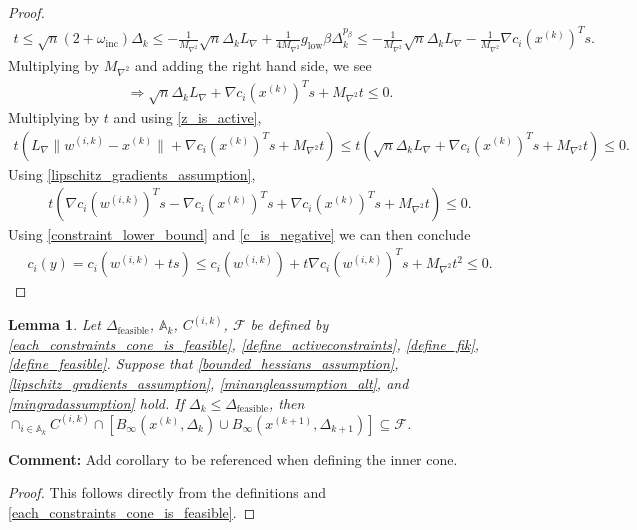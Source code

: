 \documentclass{article}
\newenvironment{comment}
  {\par\medskip
   \color{red}%
   \begin{framed}
   \textbf{Comment: }\ignorespaces}
 {\end{framed}
  \medskip}
\newtheorem{lemma}[theorem]{Lemma}
\theoremstyle{case}
\numberwithin{theorem}{subsection}
\newcommand{\activeconstraintsk}{{\mathbb A_{k}}}
\newcommand{\dfeas}{{\Delta_{\textrm{feasible}}}}
\newcommand{\dk}{\Delta_k}
\newcommand{\dkpo}{\Delta_{k+1}}
\newcommand{\feasible}{{\mathcal F}}
\newcommand{\lipgrad}{{L_{\nabla}}}
\newcommand{\maxhessian}{{M_{\nabla^2}}}
\newcommand{\mingrad}{{ g_{\textrm{low}} }}
\newcommand{\omegainc}{\omega_{\text{inc}}}
\newcommand{\tr}{{ B_{\infty}\left(\xk, \dk\right) }}
\newcommand{\trkpo}{{ B_{\infty}\left(\xkpo, \dkpo\right) }}
\newcommand{\wik}{{w^{(i, k)}}}
\newcommand{\xkpo}{{{x}^{(k+1)}}}
\newcommand{\xk}{x^{(k)}}
\newcommand{\fik}{{C^{(i, k)}}}
\begin{document}
\begin{proof}
\begin{align*}
t 
\le \sqrt{n} \left(2 + \omegainc \right) \dk 
\le -\frac 1 \maxhessian \sqrt{n}\dk \lipgrad + \frac 1 {4\maxhessian} \mingrad \beta \dk^{p_{\beta}}
\le -\frac 1 \maxhessian \sqrt{n}\dk \lipgrad -\frac 1 \maxhessian \nabla c_i(\xk)^Ts.
\end{align*}
Multiplying by $\maxhessian$ and adding the right hand side, we see
\begin{align*}
\Longrightarrow \sqrt{n}\dk \lipgrad + \nabla c_i(\xk)^Ts + \maxhessian t \le 0.
\end{align*}
Multiplying by $t$ and using \cref{z_is_active},
\begin{align*}
 t \left(\lipgrad\|\wik - \xk\| + \nabla c_i(\xk)^Ts + \maxhessian t\right) \le t \left(\sqrt{n}\dk \lipgrad + \nabla c_i(\xk)^Ts + \maxhessian t\right) \le 0.
\end{align*}
Using \cref{lipschitz_gradients_assumption},
\begin{align*}
t \left(\nabla c_i(\wik)^Ts - \nabla c_i(\xk)^Ts + \nabla c_i(\xk)^Ts + \maxhessian t\right) \le 0.
\end{align*}
Using \cref{constraint_lower_bound} and \cref{c_is_negative} we can then conclude
\begin{align*}
c_i(y) = c_i(\wik + ts) \le c_i(\wik) + t\nabla c_i(\wik)^Ts + \maxhessian t^2 \le 0.
\end{align*}

\end{proof}




\begin{lemma}
\label{cone_and_tr_are_feasible}
Let $\dfeas$, $\activeconstraintsk$, $\fik$, $\feasible$
be defined by
\cref{each_constraints_cone_is_feasible},
\cref{define_activeconstraints},
\cref{define_fik},
\cref{define_feasible}.
Suppose that 
\cref{bounded_hessians_assumption},
\cref{lipschitz_gradients_assumption},
\cref{minangleassumption_alt},
and \cref{mingradassumption} hold.
If $\dk \le \dfeas$, then $\cap_{i \in \activeconstraintsk} \fik \cap \left[\tr \cup \trkpo\right] \subseteq \feasible$.
\end{lemma}


\begin{comment}
Add corollary to be referenced when defining the inner cone.
\end{comment}

\begin{proof}
This follows directly from the definitions and \cref{each_constraints_cone_is_feasible}.
\end{proof}
\end{document}
